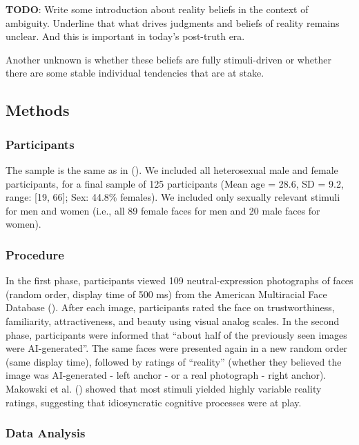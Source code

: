 \documentclass[
  jou,
  floatsintext,
  longtable,
  nolmodern,
  notxfonts,
  notimes,
  colorlinks=true,linkcolor=blue,citecolor=blue,urlcolor=blue]{apa7}
\begin{document}
\textbf{TODO}: Write some introduction about reality beliefs in the
context of ambiguity. Underline that what drives judgments and beliefs
of reality remains unclear. And this is important in today's post-truth
era.

Another unknown is whether these beliefs are fully stimuli-driven or
whether there are some stable individual tendencies that are at stake.

\subsection{Methods}\label{methods}

\subsubsection{Participants}\label{participants}

The sample is the same as in (). We included all heterosexual male and female participants,
for a final sample of 125 participants (Mean age = 28.6, SD = 9.2,
range: {[}19, 66{]}; Sex: 44.8\% females). We included only sexually
relevant stimuli for men and women (i.e., all 89 female faces for men
and 20 male faces for women).

\subsubsection{Procedure}\label{procedure}

In the first phase, participants viewed 109 neutral-expression
photographs of faces (random order, display time of 500 ms) from the
American Multiracial Face Database
(). After each
image, participants rated the face on trustworthiness, familiarity,
attractiveness, and beauty using visual analog scales. In the second
phase, participants were informed that ``about half of the previously
seen images were AI-generated''. The same faces were presented again in
a new random order (same display time), followed by ratings of
``reality'' (whether they believed the image was AI-generated - left
anchor - or a real photograph - right anchor). Makowski et al.
() showed that most stimuli yielded
highly variable reality ratings, suggesting that idiosyncratic cognitive
processes were at play.

\subsubsection{Data Analysis}\label{data-analysis}
\end{document}
